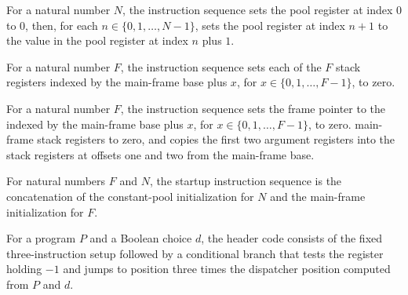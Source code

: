 \begin{definition}
\label{Light.Compiler.poolCode}
\leanok
{}
For a natural number $N$, the instruction sequence sets the pool register at index $0$
to $0$, then, for each $n\in\{0,1,\ldots,N-1\}$, sets the pool register at index $n+1$ to
the value in the pool register at index $n$ plus $1$.
\end{definition}

\begin{definition}
\label{Light.Compiler.zeroCode}
\leanok
{}
For a natural number $F$, the instruction sequence sets each of the $F$ stack registers
indexed by the main-frame base plus $x$, for $x\in\{0,1,\ldots,F-1\}$, to zero.
\end{definition}

\begin{definition}
\label{Light.Compiler.frameCode}
\leanok
{}
For a natural number $F$, the instruction sequence sets the frame pointer to the
indexed by the main-frame base plus $x$, for $x\in\{0,1,\ldots,F-1\}$, to zero.
main-frame stack registers to zero, and copies the first two argument registers into the
stack registers at offsets one and two from the main-frame base.
\end{definition}

\begin{definition}
\label{Light.Compiler.startStraight}
\leanok
{}
For natural numbers $F$ and $N$, the startup instruction sequence is the concatenation
of the constant-pool initialization for $N$ and the main-frame initialization for $F$.
\end{definition}

\begin{definition}
\label{Light.Compiler.headCode}
\leanok
{}
For a program $P$ and a Boolean choice $d$, the header code consists of the fixed
three-instruction setup followed by a conditional branch that tests the register holding
$-1$ and jumps to position three times the dispatcher position computed from $P$ and
$d$.
\end{definition}

